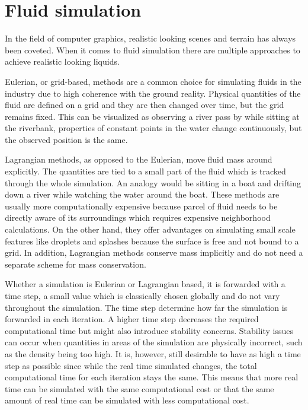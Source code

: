 \documentclass[../../main.tex]{subfiles}
\begin{document}

\section{Fluid simulation}

In the field of computer graphics, realistic looking scenes and terrain has always been coveted. When it comes to fluid simulation there are multiple approaches to achieve realistic looking liquids. 







Eulerian, or grid-based, methods are a common choice for simulating fluids in the industry due to high coherence with the ground reality. Physical quantities of the fluid are defined on a grid and they are then changed over time, but the grid remains fixed. This can be visualized as observing a river pass by while sitting at the riverbank, properties of constant points in the water change continuously, but the observed position is the same. 

Lagrangian methods, as opposed to the Eulerian, move fluid mass around explicitly. The quantities are tied to a small part of the fluid which is tracked through the whole simulation. An analogy would be sitting in a boat and drifting down a river while watching the water around the boat. These methods are usually more computationally expensive because parcel of fluid needs to be directly aware of its surroundings which requires expensive neighborhood calculations. On the other hand, they offer advantages on simulating small scale features like droplets and splashes because the surface is free and not bound to a grid. In addition, Lagrangian methods conserve mass implicitly and do not need a separate scheme for mass conservation. 

Whether a simulation is Eulerian or Lagrangian based, it is forwarded with a time step, a small value which is classically chosen globally and do not vary throughout the simulation. The time step determine how far the simulation is forwarded in each iteration. A higher time step decreases the required computational time but might also introduce stability concerns. Stability issues can occur when quantities in areas of the simulation are physically incorrect, such as the density being too high. It is, however, still desirable to have as high a time step as possible since while the real time simulated changes, the total computational time for each iteration stays the same. This means that more real time can be simulated with the same computational cost or that the same amount of real time can be simulated with less computational cost.
\end{document}
